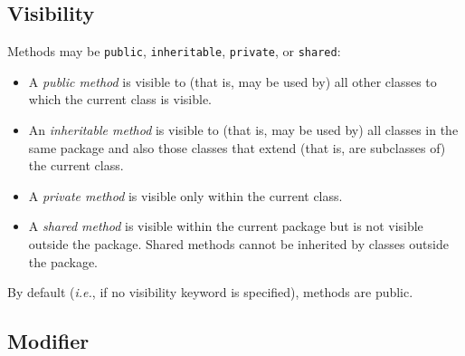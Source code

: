 \subsection{Visibility}
 
Methods may be \texttt{public}, \texttt{inheritable},
\texttt{private}, or \texttt{shared}:
\begin{itemize}
\item A \emph{public method} is visible to (that is, may be used by)
all other classes to which the current class is visible.
\item An \emph{inheritable method} is visible to (that is, may be used
by) all classes in the same package and also those classes that extend
(that is, are subclasses of) the current class.
\item A \emph{private method} is visible only within the current
class.
\item 
A \emph{shared method} is visible within the current package
but is not visible outside the package.  Shared methods cannot be
inherited by classes outside the package.
\end{itemize}
 
By default (\emph{i.e.}, if no visibility keyword is specified),  methods
are public.
\subsection{Modifier}
 
